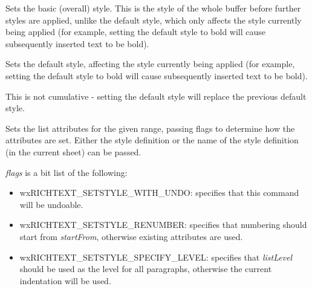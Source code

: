 \label{wxrichtextbuffersetbasicstyle}


Sets the basic (overall) style. This is the style of the whole
buffer before further styles are applied, unlike the default style, which
only affects the style currently being applied (for example, setting the default
style to bold will cause subsequently inserted text to be bold).

\label{wxrichtextbuffersetdefaultstyle}


Sets the default style, affecting the style currently being applied (for example, setting the default
style to bold will cause subsequently inserted text to be bold).

This is not cumulative - setting the default style will replace the previous default style.

\label{wxrichtextbuffersetliststyle}



Sets the list attributes for the given range, passing flags to determine how the attributes are set.
Either the style definition or the name of the style definition (in the current sheet) can be passed.

{\it flags} is a bit list of the following:

\begin{itemize}\itemsep=0pt
\item wxRICHTEXT\_SETSTYLE\_WITH\_UNDO: specifies that this command will be undoable.
\item wxRICHTEXT\_SETSTYLE\_RENUMBER: specifies that numbering should start from {\it startFrom}, otherwise existing attributes are used.
\item wxRICHTEXT\_SETSTYLE\_SPECIFY\_LEVEL: specifies that {\it listLevel} should be used as the level for all paragraphs, otherwise the current indentation will be used.
\end{itemize}

